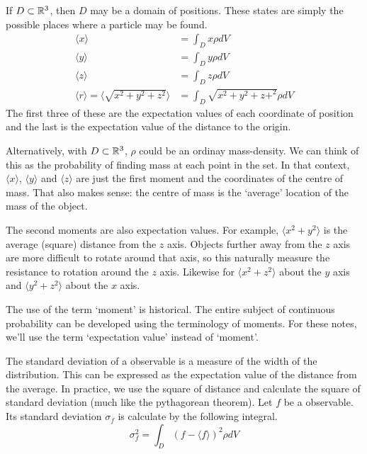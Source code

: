 \documentclass[fleqn,letterpaper]{report}
\begin{document}
If $D \subset \mathbb{R}^3$, then $D$ may be a domain of positions.
These states are simply the possible places where a particle
may be found. 
\begin{align*}
\langle x\rangle & = \int_D x \rho dV \\
\langle y\rangle & = \int_D y \rho dV \\
\langle z\rangle & = \int_D z \rho dV \\
\langle r \rangle = \langle \sqrt{x^2+y^2+z^2}\rangle & =
\int_D \sqrt{x^2+y^2+z+^2} \rho dV
\end{align*}
The first three of these are the expectation values of each
coordinate of position and the last is the expectation value
of the distance to the origin.

Alternatively, with $D \subset \mathbb{R}^3$, $\rho$ could be an
ordinay mass-density. We can think of this as the probability
of finding mass at each point in the set. In that context,
$\langle x\rangle$, $\langle y\rangle$ and $\langle z\rangle$
are just the first moment and the coordinates of the centre of
mass. That also makes sense: the centre of mass is the
`average' location of the mass of the object. 

The second moments are also expectation values. For example,
$\langle x^2 + y^2\rangle$ is the average (square) distance
from the $z$ axis. Objects further away from the $z$ axis are
more difficult to rotate around that axis, so this naturally
measure the resistance to rotation around the $z$ axis.
Likewise for $\langle x^2 + z^2\rangle$ about the $y$ axis and
$\langle y^2 + z^2\rangle$ about the $x$ axis. 

The use of the term `moment' is historical. The entire subject
of continuous probability can be developed using the terminology
of moments. For these notes, we'll use the term `expectation
value' instead of `moment'.

\begin{defn}
The standard deviation of a observable is a measure of the
width of the distribution. This can be expressed as the
expectation value of the distance from the average. In
practice, we use the square of distance and calculate the
square of standard deviation (much like the pythagorean
theorem). Let $f$ be a observable. Its standard deviation
$\sigma_f$ is calculate by the following integral.
\begin{equation*}
\sigma^2_f = \int_D (f-\langle f\rangle)^2 \rho dV
\end{equation*}
\end{defn}
\end{document}

